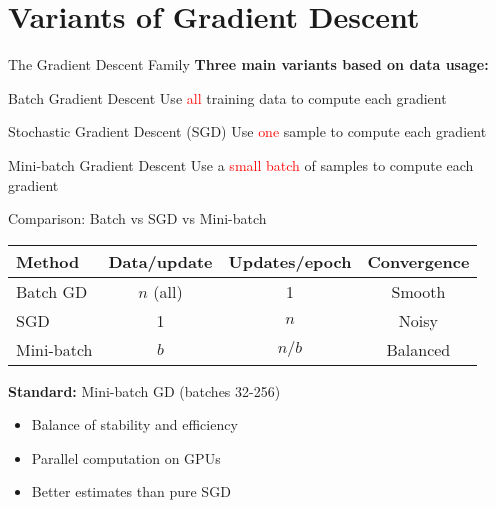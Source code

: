 \documentclass[usenames,dvipsnames]{beamer}
\begin{document}
  \section{Variants of Gradient Descent}

  \begin{frame}{The Gradient Descent Family}
    \textbf{Three main variants based on data usage:}
    
    \begin{definitionbox}{Batch Gradient Descent}
    Use \textcolor{red}{all} training data to compute each gradient
    \end{definitionbox}
    
    \begin{definitionbox}{Stochastic Gradient Descent (SGD)}
    Use \textcolor{red}{one} sample to compute each gradient
    \end{definitionbox}
    
    \begin{definitionbox}{Mini-batch Gradient Descent}
    Use a \textcolor{red}{small batch} of samples to compute each gradient
    \end{definitionbox}
  \end{frame}

  \begin{frame}{Comparison: Batch vs SGD vs Mini-batch}
    \begin{center}
    \begin{tabular}{|l|c|c|c|}
        \hline
        \textbf{Method} & \textbf{Data/update} & \textbf{Updates/epoch} & \textbf{Convergence} \\
        \hline
        Batch GD & $n$ (all) & 1 & Smooth \\
        \hline
        SGD & 1 & $n$ & Noisy \\
        \hline
        Mini-batch & $b$ & $n/b$ & Balanced \\
        \hline
    \end{tabular}
    \end{center}
    
    \pause
    \begin{keypointsbox}{}
    {\scriptsize \textbf{Standard:} Mini-batch GD (batches 32-256)
    \begin{itemize}
        \item Balance of stability and efficiency
        \item Parallel computation on GPUs
        \item Better estimates than pure SGD
    \end{itemize}}
    \end{keypointsbox}
  \end{frame}
\end{document}
